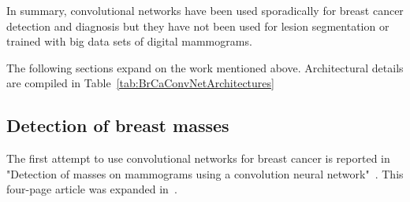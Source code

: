 In summary, convolutional networks have been used sporadically for breast cancer detection and diagnosis but they have not been used for lesion segmentation or trained with big data sets of digital mammograms. 

The following sections expand on the work mentioned above. Architectural details are compiled in Table~\ref{tab:BrCaConvNetArchitectures}%


\begin{comment}
Separated in blocks:
	1. Initial mass: Sahiran 1996 (michigan)
	2. Intial microcalc detection: Lo 1995- Lo 1998 (georgetown/both)
	3. Optimal architecture for microcalc: Gurcan 2000-Gurcan 2002 (michigan)
	4. CAD for microcalcification in FFDM. Ge 2007 (CAD for masses didn't use Convnets, used LDA and rule-based classifiers). (michigan)
	5. Late mass diagnosis
\end{comment}

\subsection{Detection of breast masses}
The first attempt to use convolutional networks for breast cancer is reported in "Detection of masses on mammograms using a convolution neural network"~\cite{Wei1995}. This four-page article was expanded in~\cite{Sahiner1996}.

